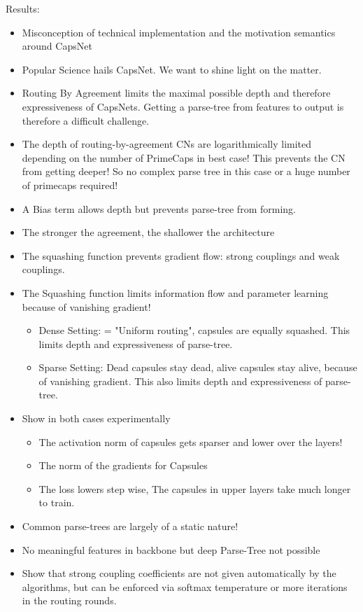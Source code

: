 \documentclass{article}
\begin{document}
Results:
\begin{itemize}
	\item Misconception of technical implementation and the motivation semantics around CapsNet
	\item Popular Science hails CapsNet. We want to shine light on the matter.
	\item Routing By Agreement limits the maximal possible depth and therefore expressiveness of CapsNets. Getting a parse-tree from features to output is therefore a difficult challenge. 
	\item The depth of routing-by-agreement CNs are logarithmically limited depending on the number of PrimeCaps in best case! This prevents the CN from getting deeper! So no complex parse tree in this case or a huge number of primecaps required!
	\item A Bias term allows depth but prevents parse-tree from forming.
	\item The stronger the agreement, the shallower the architecture
	\item The squashing function prevents gradient flow: strong couplings and weak couplings.
	\item The Squashing function limits information flow and parameter learning because of vanishing gradient!
	\begin{itemize}
		\item Dense Setting: = "Uniform routing", capsules are equally squashed. This limits depth and expressiveness of parse-tree.
		\item Sparse Setting: Dead capsules stay dead, alive capsules stay alive, because of vanishing gradient. This also limits depth and expressiveness of parse-tree.
	\end{itemize}
	\item Show in both cases experimentally
	\begin{itemize}
		\item The activation norm of capsules gets sparser and lower over the layers!
		\item The norm of the gradients for Capsules
		\item The loss lowers step wise, The capsules in upper layers take much longer to train.
	\end{itemize}
	\item Common parse-trees are largely of a static nature!
	\item No meaningful features in backbone but deep Parse-Tree not possible
	\item Show that strong coupling coefficients are not given automatically by the algorithms, but can be enforced via softmax temperature or more iterations in the routing rounds.

\end{itemize}
\end{document}
